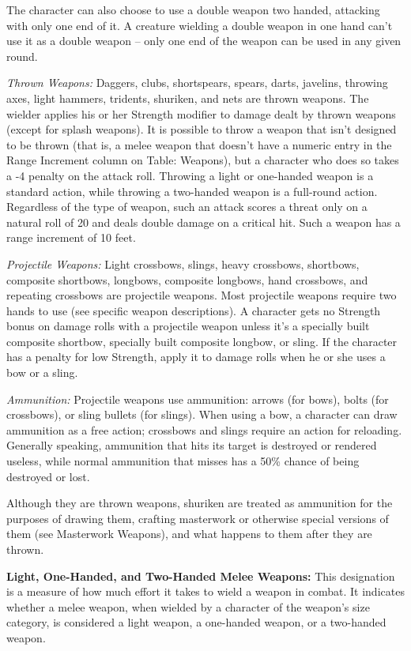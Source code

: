 The character can also choose to use a double weapon two handed, attacking with only one end of it. A creature wielding a double weapon in one hand can't use it as a double weapon -- only one end of the weapon can be used in any given round.

\textit{Thrown Weapons:} Daggers, clubs, shortspears, spears, darts, javelins, throwing axes, light hammers, tridents, shuriken, and nets are thrown weapons. The wielder applies his or her Strength modifier to damage dealt by thrown weapons (except for splash weapons). It is possible to throw a weapon that isn't designed to be thrown (that is, a melee weapon that doesn't have a numeric entry in the Range Increment column on Table: Weapons), but a character who does so takes a -4 penalty on the attack roll. Throwing a light or one-handed weapon is a standard action, while throwing a two-handed weapon is a full-round action. Regardless of the type of weapon, such an attack scores a threat only on a natural roll of 20 and deals double damage on a critical hit. Such a weapon has a range increment of 10 feet.

\textit{Projectile Weapons:} Light crossbows, slings, heavy crossbows, shortbows, composite shortbows, longbows, composite longbows, hand crossbows, and repeating crossbows are projectile weapons. Most projectile weapons require two hands to use (see specific weapon descriptions). A character gets no Strength bonus on damage rolls with a projectile weapon unless it's a specially built composite shortbow, specially built composite longbow, or sling. If the character has a penalty for low Strength, apply it to damage rolls when he or she uses a bow or a sling.

\textit{Ammunition:} Projectile weapons use ammunition: arrows (for bows), bolts (for crossbows), or sling bullets (for slings). When using a bow, a character can draw ammunition as a free action; crossbows and slings require an action for reloading. Generally speaking, ammunition that hits its target is destroyed or rendered useless, while normal ammunition that misses has a 50\% chance of being destroyed or lost.

Although they are thrown weapons, shuriken are treated as ammunition for the purposes of drawing them, crafting masterwork or otherwise special versions of them (see Masterwork Weapons), and what happens to them after they are thrown.

\vspace{12pt}
\textbf{Light, One-Handed, and Two-Handed Melee Weapons:} This designation is a measure of how much effort it takes to wield a weapon in combat. It indicates whether a melee weapon, when wielded by a character of the weapon's size category, is considered a light weapon, a one-handed weapon, or a two-handed weapon.

